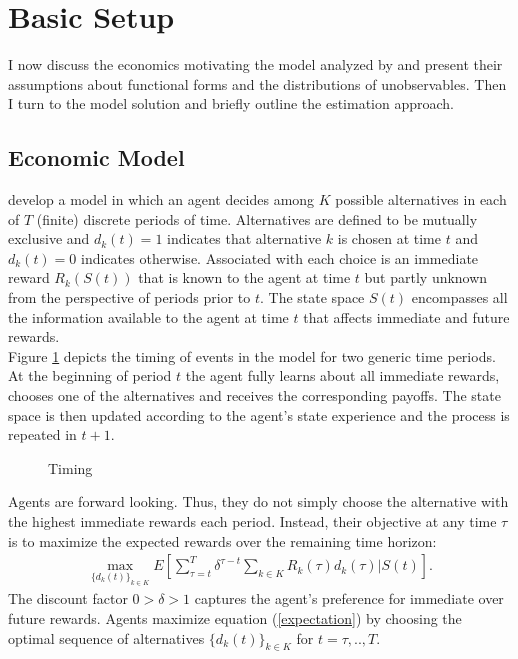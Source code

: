 \section{Basic Setup}\label{Setup}
I now discuss the economics motivating the model analyzed by \citet{Keane.1994} and present their assumptions about functional forms and the distributions of unobservables. Then I turn to the model solution and briefly outline the estimation approach.
\subsection{Economic Model}
\citet{Keane.1994} develop a model in which an agent decides among $K$ possible alternatives in each of $T$ (finite) discrete periods of time. Alternatives are defined to be mutually exclusive and $d_k(t) = 1$ indicates that alternative $k$ is chosen at time $t$ and $d_k(t)  = 0$ indicates otherwise. Associated with each choice is an immediate reward $R_k(S(t))$ that is known to the agent at time $t$ but partly unknown from the perspective of periods prior to $t$. The state space $S(t)$ encompasses all the information available to the agent at time $t$ that affects immediate and future rewards.\\\newline
%
Figure \ref{Timing} depicts the timing of events in the model for two generic time periods. At the beginning of period $t$ the agent fully learns about all immediate rewards, chooses one of the alternatives and receives the corresponding payoffs. The state space is then updated according to the agent's state experience and the process is repeated in $t + 1$.
%
\begin{figure}\caption{Timing}\label{Timing}\vspace{1.0cm}\centering

\end{figure}
%
Agents are forward looking. Thus, they do not simply choose the alternative with the highest immediate rewards each period. Instead, their objective at any time $\tau$ is to maximize the expected rewards over the remaining time horizon:
%
\begin{align}\label{expectation}
\max_{\{d_k(t)\}_{k \in K}} E\left[ \sum_{\tau = t}^T \delta^{\tau - t} \sum_{k\in K}R_k(\tau)d_k(\tau)\Bigg| S(t)\right].
\end{align}
%
The discount factor $0 > \delta > 1$ captures the agent's preference for immediate over future rewards. Agents maximize equation (\ref{expectation}) by choosing the optimal sequence of alternatives $\{d_k(t)\}_{k \in K}$ for $t = \tau, .., T$.\\\newline

